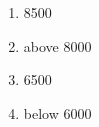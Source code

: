 \documentclass[journal,12pt,onecolumn]{IEEEtran}
\theoremstyle{remark}
\begin{document}
\begin{enumerate}
\begin{multicols}{2}
\begin{enumerate}
    \item 8500
    \item above 8000
    \item 6500
    \item below 6000
\end{enumerate}
\end{multicols}





































































































\end{enumerate}
\end{document}
